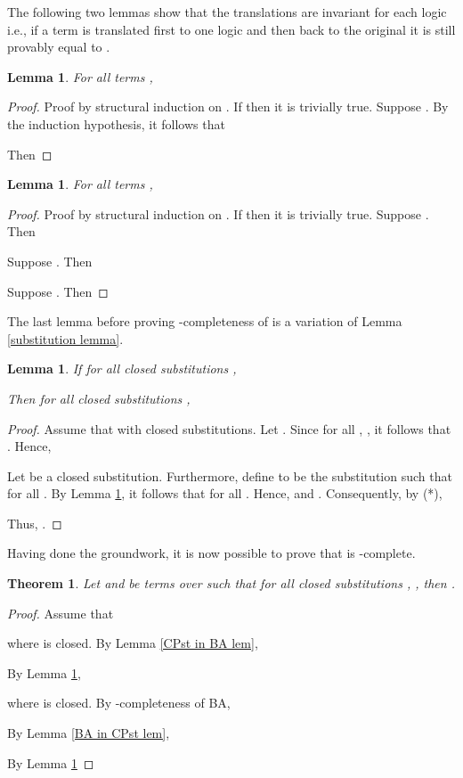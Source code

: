 \documentclass[a4paper,twoside,openright]{report}
\newtheorem{lem}[theorem]{Lemma}
\newtheorem{thm}[theorem]{Theorem}
\begin{document}
The following two lemmas show that the translations are invariant for each logic i.e., if a term  is translated first to one logic and then back to the original it is still provably equal to .
\begin{lem}\label{trans invariance CPst lem}
For all terms , 

\end{lem}
\begin{proof}
Proof by structural induction on . If  then it is trivially true. Suppose . By the induction hypothesis, it follows that

Then

\end{proof}

\begin{lem}\label{trans invariance BA lem}
For all terms , 

\end{lem}
\begin{proof}
Proof by structural induction on . If  then it is trivially true. Suppose . Then

Suppose . Then

Suppose . Then

\end{proof}

The last lemma before proving -completeness of  is a variation of Lemma \ref{substitution lemma}.
\begin{lem}\label{trans subst lem}
If for all closed substitutions ,

Then for all closed substitutions ,

\end{lem}
\begin{proof}
Assume that  with  closed substitutions. Let . Since for all , , it follows that . Hence,

Let  be a closed substitution. Furthermore, define  to be the substitution such that  for all . By Lemma \ref{trans invariance BA lem}, it follows that  for all . Hence,  and . Consequently, by (*),

Thus, .
\end{proof}
Having done the groundwork, it is now possible to prove that  is -complete.
\begin{thm}
Let  and  be terms over  such that for all closed substitutions , , then .
\end{thm}
\begin{proof}
Assume that

where  is closed. By Lemma \ref{CPst in BA lem},

By Lemma \ref{trans subst lem},

where  is closed. By -completeness of BA,

By Lemma \ref{BA in CPst lem},

By Lemma \ref{trans invariance CPst lem}

\end{proof}
\end{document}
